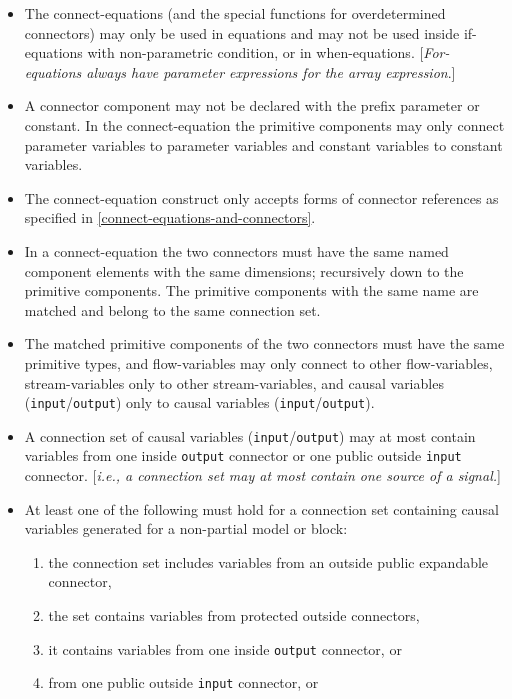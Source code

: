 \begin{itemize}
\item
  The connect-equations (and the special functions for overdetermined
  connectors) may only be used in equations and may not be used inside
  if-equations with non-parametric condition, or in when-equations.
  {[}\emph{For-equations always have parameter expressions for the array
  expression}.{]}
\item
  A connector component may not be declared with the prefix parameter or
  constant. In the connect-equation the primitive components may only
  connect parameter variables to parameter variables and constant
  variables to constant variables.
\item
  The connect-equation construct only accepts forms of connector
  references as specified in \autoref{connect-equations-and-connectors}.
\item
  In a connect-equation the two connectors must have the same named
  component elements with the same dimensions; recursively down to the
  primitive components. The primitive components with the same name are
  matched and belong to the same connection set.
\item
  The matched primitive components of the two connectors must have the
  same primitive types, and flow-variables may only connect to other
  flow-variables, stream-variables only to other stream-variables, and
  causal variables (\lstinline!input!/\lstinline!output!) only to causal variables
  (\lstinline!input!/\lstinline!output!).
\item
  A connection set of causal variables (\lstinline!input!/\lstinline!output!) may at most
  contain variables from one inside \lstinline!output! connector or one public
  outside \lstinline!input! connector. {[}\emph{i.e., a connection set may at most
  contain one source of a signal.}{]}
\item
  At least one of the following must hold for a connection set
  containing causal variables generated for a non-partial model or
  block:
\begin{enumerate}
\item the connection set includes variables from an outside public
  expandable connector,
\item the set contains variables from protected
  outside connectors,
\item it contains variables from one inside \lstinline!output!
  connector, or
\item from one public outside \lstinline!input! connector, or

\end{enumerate}
\end{itemize}
